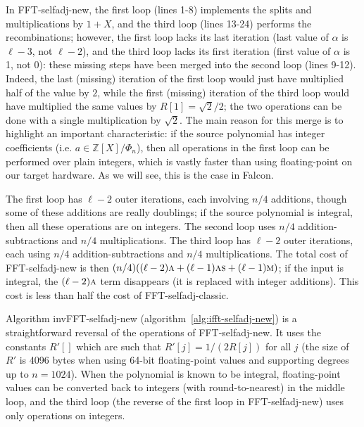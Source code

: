 \documentclass{llncs}
\newcommand{\bZ}{\mathbb{Z}}
\begin{document}
In \textsf{FFT-selfadj-new}, the first loop (lines 1-8) implements the
splits and multiplications by $1 + X$, and the third loop (lines 13-24)
performs the recombinations; however, the first loop lacks its last
iteration (last value of $\alpha$ is $\ell - 3$, not $\ell - 2$), and
the third loop lacks its first iteration (first value of $\alpha$ is 1,
not 0): these missing steps have been merged into the second loop (lines
9-12). Indeed, the last (missing) iteration of the first loop would just
have multiplied half of the value by $2$, while the first (missing)
iteration of the third loop would have multiplied the same values by
$R[1] = \sqrt{2}/2$; the two operations can be done with a single
multiplication by $\sqrt{2}$. The main reason for this merge is to
highlight an important characteristic: if the source polynomial has
integer coefficients (i.e. $a \in \bZ[X]/\Phi_n$), then all operations
in the first loop can be performed over plain integers, which is vastly
faster than using floating-point on our target hardware. As we will see,
this is the case in Falcon.

The first loop has $\ell - 2$ outer iterations, each involving $n/4$
additions, though some of these additions are really doublings; if the
source polynomial is integral, then all these operations are on
integers. The second loop uses $n/4$ addition-subtractions and $n/4$
multiplications. The third loop has $\ell - 2$ outer iterations, each
using $n/4$ addition-subtractions and $n/4$ multiplications. The total
cost of \textsf{FFT-selfadj-new} is then $(n/4)((\ell - 2)\text{\textsc{a}}
+ (\ell - 1)\text{\textsc{as}} + (\ell - 1)\text{\textsc{m}})$; if the
input is integral, the $(\ell - 2)\text{\textsc{a}}$ term disappears
(it is replaced with integer additions). This cost is less than half
the cost of \textsf{FFT-selfadj-classic}.

Algorithm \textsf{invFFT-selfadj-new}
(algorithm~\ref{alg:ifft-selfadj-new}) is a straightforward reversal of
the operations of \textsf{FFT-selfadj-new}. It uses the constants $R'[]$
which are such that $R'[j] = 1/(2R[j])$ for all $j$ (the size of $R'$ is
4096 bytes when using 64-bit floating-point values and supporting
degrees up to $n = 1024$). When the polynomial is known to be integral,
floating-point values can be converted back to integers (with
round-to-nearest) in the middle loop, and the third loop (the reverse of
the first loop in \textsf{FFT-selfadj-new}) uses only operations on
integers.
\end{document}
